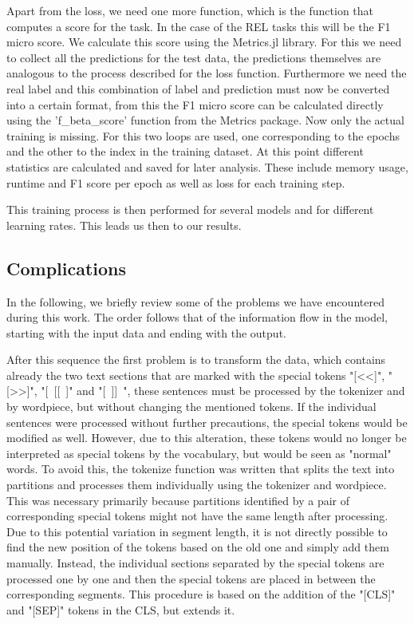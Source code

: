 Apart from the loss, we need one more function, which is the function that computes a score for the task. In the case of the REL tasks this will be the F1 micro score. We calculate this score using the Metrics.jl \cite{Kumar2020} library. For this we need to collect all the predictions for the test data, the predictions themselves are analogous to the process described for the loss function. Furthermore we need the real label and this combination of label and prediction must now be converted into a certain format, from this the F1 micro score can be calculated directly using the 'f\_beta\_score' function from the Metrics package. \cite{Kumar2020}
Now only the actual training is missing. For this two loops are used, one corresponding to the epochs and the other to the index in the training dataset. At this point different statistics are calculated and saved for later analysis. These include memory usage, runtime and F1 score per epoch as well as loss for each training step. 

This training process is then performed for several models and for different learning rates. This leads us then to our results. 

\subsection{Complications}
In the following, we briefly review some of the problems we have encountered during this work. The order follows that of the information flow in the model, starting with the input data and ending with the output. 

After this sequence the first problem is to transform the data, which contains already the two text sections that are marked with the special tokens "[\textless\textless]", "[\textgreater\textgreater]", "[~[[~]" and "[~]]~", these sentences must be processed by the tokenizer and by wordpiece, but without changing the mentioned tokens. If the individual sentences were processed without further precautions, the special tokens would be modified as well. However, due to this alteration, these tokens would no longer be interpreted as special tokens by the vocabulary, but would be seen as "normal" words. To avoid this, the tokenize function was written that splits the text into partitions and processes them individually using the tokenizer and wordpiece. This was necessary primarily because partitions identified by a pair of corresponding special tokens might not have the same length after processing. Due to this potential variation in segment length, it is not directly possible to find the new position of the tokens based on the old one and simply add them manually. Instead, the individual sections separated by the special tokens are processed one by one and then the special tokens are placed in between the corresponding segments. This procedure is based on the addition of the "[CLS]" and "[SEP]" tokens in the CLS, but extends it. 

